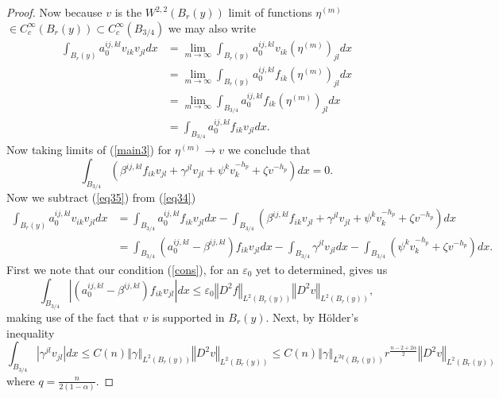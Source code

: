\documentclass[12pt,leqno]{amsart}%
\theoremstyle{plain}
\numberwithin{equation}{section}
\theoremstyle{definition}
\begin{document}
\begin{proof}
Now because $v$ is the $W^{2,2}(B_{r}(y))$ limit of functions $\eta^{(m)}$
$\in C_{c}^{\infty}(B_{r}(y))\subset C_{c}^{\infty}(B_{3/4})$ we may also
write
\begin{align}
\int_{B_{r}(y)}a_{0}^{ij,kl}v_{ik}v_{jl}dx  &  =\lim_{m\rightarrow\infty}%
\int_{B_{r}(y)}a_{0}^{ij,kl}v_{ik}(\eta^{(m)})_{jl}dx\nonumber\\
&  =\lim_{m\rightarrow\infty}\int_{B_{r}(y)}a_{0}^{ij,kl}f_{ik}(\eta
^{(m)})_{jl}dx\nonumber\\
&  =\lim_{m\rightarrow\infty}\int_{B_{3/4}}a_{0}^{ij,kl}f_{ik}(\eta
^{(m)})_{jl}dx\nonumber\\
&  =\int_{B_{3/4}}a_{0}^{ij,kl}f_{ik}v_{jl}dx. \label{eq34}%
\end{align}
Now taking limits of (\ref{main3}) for $\eta^{(m)}\rightarrow v$ we conclude
that
\begin{equation}
\int_{B_{3/4}}\left(  \beta^{ij,kl}f_{ik}v_{jl}+\gamma^{jl}v_{jl}+\psi
^{k}v_{k}^{-h_{p}}+\zeta v^{-h_{p}}\right)  dx=0. \label{eq35}%
\end{equation}
Now we subtract (\ref{eq35}) from (\ref{eq34})
\begin{align}
\int_{B_{r}(y)}a_{0}^{ij,kl}v_{ik}v_{jl}dx  &  =\int_{B_{3/4}}a_{0}%
^{ij,kl}f_{ik}v_{jl}dx-\int_{B_{3/4}}\left(  \beta^{ij,kl}f_{ik}v_{jl}%
+\gamma^{jl}v_{jl}+\psi^{k}v_{k}^{-h_{p}}+\zeta v^{-h_{p}}\right)
dx\label{eq36}\\
&  =\int_{B_{3/4}}\left(  a_{0}^{ij,kl}-\beta^{ij,kl}\right)  f_{ik}%
v_{jl}dx-\int_{B_{3/4}}\gamma^{jl}v_{jl}dx-\int_{B_{3/4}}\left(  \psi^{k}%
v_{k}^{-h_{p}}+\zeta v^{-h_{p}}\right)  dx.\nonumber
\end{align}
First we note that our condition (\ref{cons}), for an $\varepsilon_{0}$ yet to
determined, gives us%
\begin{equation}
\int_{B_{3/4}}\left\vert (a_{0}^{ij,kl}-\beta^{ij,kl})f_{ik}v_{jl}\right\vert
dx\leq\varepsilon_{0}\left\Vert D^{2}f\right\Vert _{L^{2}(B_{r}(y))}\left\Vert
D^{2}v\right\Vert _{L^{2}(B_{r}(y))}, \label{eq37}%
\end{equation}
making use of the fact that $v$ is supported in $B_{r}(y).$ Next, by
H\"{o}lder's inequality
\begin{equation}
\int_{B_{3/4}}|\gamma^{jl}v_{jl}|dx\leq C(n)\left\Vert \gamma\right\Vert
_{L^{2}(B_{r}(y))}\left\Vert D^{2}v\right\Vert _{L^{2}(B_{r}(y))}\leq
C(n)\left\Vert \gamma\right\Vert _{L^{2q}(B_{r}(y))}r^{\frac{n-2+2\alpha}{2}%
}\left\Vert D^{2}v\right\Vert _{L^{2}(B_{r}(y))} \label{eq38}%
\end{equation}
where $q=\frac{n}{2(1-\alpha)}$.


\end{proof}
\end{document}
